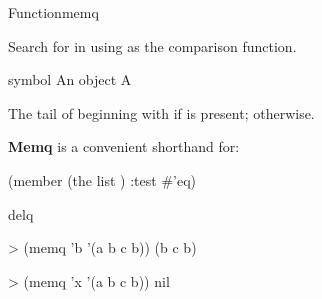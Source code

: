 \documentclass[10pt,twoside,english,pdftex]{article}
\begin{document}

\begin{functiondoc}{Function}{memq}{ \returns{}
    } 
%
  
\fnsyntax

\fnpurpose Search for  in  using  as the
comparison function.

\fnpackage {}

\fnmodule {}

\fnargs
\begin{args}{symbol}
\arg[item] An object
\arg[list] A 
\end{args}

\fnreturns The tail of  beginning with  if
 is present; \nil{} otherwise.

\fndescription \textbf{Memq} is a convenient shorthand for:
\begin{example}
  (member  (the list ) :test #'eq)
\end{example}

\begin{alsos}{delq}
\also[delq]
\end{alsos}

\fnexamples
\begin{example}
> (memq 'b '(a b c b))
(b c b)
\end{example}
\begin{example}
> (memq 'x '(a b c b))
nil
\end{example}

\end{functiondoc}

\end{document}
